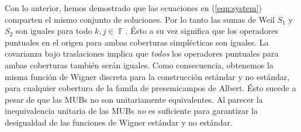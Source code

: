 \documentclass[a4paper,11pt]{report}
\DeclareMathOperator{\F}{\mathbb{F}}
\begin{document}

  Con lo anterior, hemos demostrado que las ecuaciones
  en (\ref{eqn:system}) comparten el mismo conjunto de
  soluciones. Por lo tanto las sumas de Weil $S_1$ y $S_2$
  son iguales para todo $k,j \in \F$.  Ésto a su vez
  significa que los operadores puntuales en el origen para
  ambas coberturas simplécticas son iguales. La covarianza
  bajo traslaciones implica que \textit{todos} los
  operadores puntuales para ambas coberturas también serán
  iguales. Como consecuencia, obtenemos la misma función de
  Wigner discreta para la construcción estándar y no
  estándar, para cualquier cobertura de la famila de
  presemicampos de Albert. Ésto sucede a pesar de que las
  MUBs no son unitariamente equivalentes.  Al parecer la
  inequivalencia unitaria de las MUBs \textit{no} es
  suficiente para garantizar la desigualdad de las funciones
  de Wigner estándar y no estándar.
\end{document}
